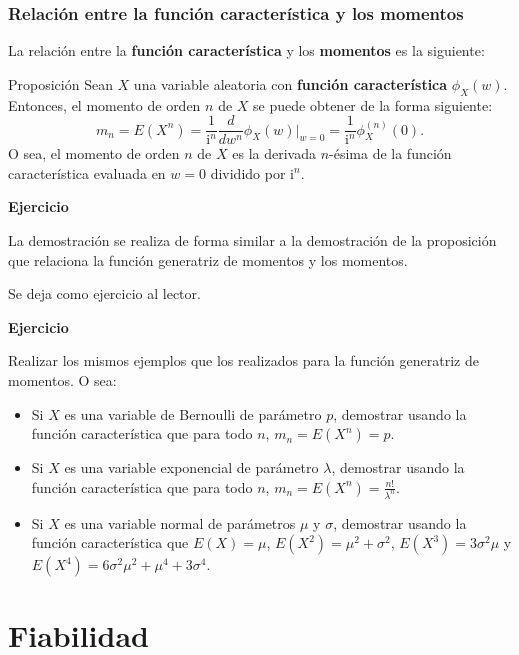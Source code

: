 \documentclass[]{book}
\begin{document}
\hypertarget{relaciuxf3n-entre-la-funciuxf3n-caracteruxedstica-y-los-momentos}{%
\subsubsection{Relación entre la función característica y los momentos}\label{relaciuxf3n-entre-la-funciuxf3n-caracteruxedstica-y-los-momentos}}

La relación entre la \textbf{función característica} y los \textbf{momentos} es la siguiente:

 Proposición
Sean \(X\) una variable aleatoria con \textbf{función característica} \(\phi_X(w)\). Entonces, el momento de orden \(n\) de \(X\) se puede obtener de la forma siguiente:
\[
m_n =E\left(X^n\right)=\frac{1}{\mathrm{i}^n}\frac{d}{d w^n}\phi_X(w)|_{w=0} =\frac{1}{\mathrm{i}^n}\phi_X^{(n)}(0).
\]
O sea, el momento de orden \(n\) de \(X\) es la derivada \(n\)-ésima de la función característica evaluada en \(w=0\) dividido por \(\mathrm{i}^n\).

\textbf{Ejercicio}

La demostración se realiza de forma similar a la demostración de la proposición que relaciona la función generatriz de momentos y los momentos.

Se deja como ejercicio al lector.

\textbf{Ejercicio}

Realizar los mismos ejemplos que los realizados para la función generatriz de momentos. O sea:

\begin{itemize}
\item
  Si \(X\) es una variable de Bernoulli de parámetro \(p\), demostrar usando la función característica que para todo \(n\), \(m_n = E\left(X^n\right)=p\).
\item
  Si \(X\) es una variable exponencial de parámetro \(\lambda\), demostrar usando la función característica que para todo \(n\), \(m_n = E\left(X^n\right)=\frac{n!}{\lambda^n}\).
\item
  Si \(X\) es una variable normal de parámetros \(\mu\) y \(\sigma\), demostrar usando la función característica que \(E(X)=\mu\), \(E\left(X^2\right)=\mu^2+\sigma^2\), \(E\left(X^3\right)=3\sigma^2\mu\) y \(E\left(X^4\right)=6\sigma^2\mu^2+\mu^4+3\sigma^4\).
\end{itemize}

\hypertarget{fiabilidad}{%
\section{Fiabilidad}\label{fiabilidad}}
\end{document}
